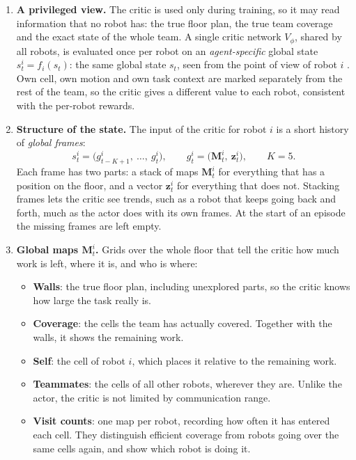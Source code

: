 \documentclass[11pt,a4paper]{article}
\begin{document}
\begin{enumerate}[label=\textbf{\arabic*.},resume]

\item \textbf{A privileged view.}
The critic is used only during training, so it may read information that no
robot has: the true floor plan, the true team coverage and the exact state of
the whole team. A single critic network $V_\phi$, shared by all robots, is
evaluated once per robot on an \emph{agent-specific} global state
$s_t^i = f_i(s_t)$: the same global state $s_t$, seen from the point of view
of robot $i$ \cite{yu2022surprising}. Own cell, own motion and own task
context are marked separately from the rest of the team, so the critic gives
a different value to each robot, consistent with the per-robot rewards.

\item \textbf{Structure of the state.}
The input of the critic for robot $i$ is a short history of \emph{global
frames}:
\[
  s_t^i = \big(g_{t-K+1}^i,\ \dots,\ g_t^i\big),
  \qquad
  g_t^i = \big(\mathbf{M}_t^i,\ \mathbf{z}_t^i\big),
  \qquad K=5.
\]
Each frame has two parts: a stack of maps $\mathbf{M}_t^i$ for everything
that has a position on the floor, and a vector $\mathbf{z}_t^i$ for
everything that does not. Stacking frames lets the critic see trends, such
as a robot that keeps going back and forth, much as the actor does with its
own frames. At the start of an episode the missing frames are left empty.

\item \textbf{Global maps $\mathbf{M}_t^i$.}
Grids over the whole floor that tell the critic how much work is left, where
it is, and who is where:
\begin{itemize}
 \item \textbf{Walls}: the true floor plan, including unexplored parts, so
       the critic knows how large the task really is.
 \item \textbf{Coverage}: the cells the team has actually covered. Together
       with the walls, it shows the remaining work.
 \item \textbf{Self}: the cell of robot $i$, which places it relative to the
       remaining work.
 \item \textbf{Teammates}: the cells of all other robots, wherever they are.
       Unlike the actor, the critic is not limited by communication range.
 \item \textbf{Visit counts}: one map per robot, recording how often it has
       entered each cell. They distinguish efficient coverage from robots
       going over the same cells again, and show which robot is doing it.
\end{itemize}


\end{enumerate}
\end{document}
